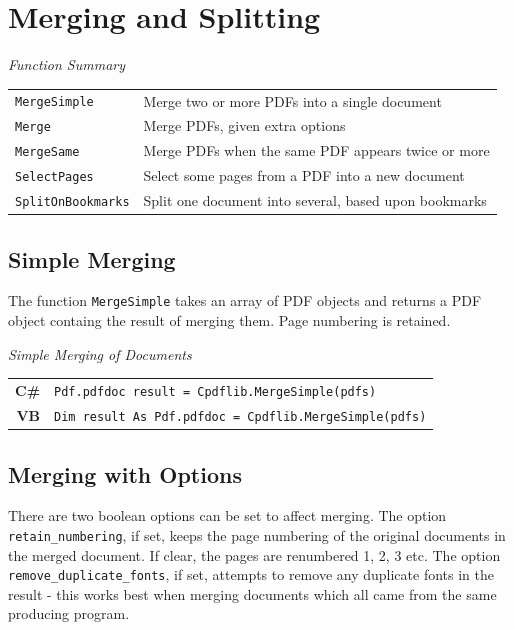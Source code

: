 \documentclass[a4paper]{memoir}
\begin{document}
\chapter{Merging and Splitting}
\begin{framed}
\noindent\textit{Function Summary}\\[2mm]
\noindent\begin{tabular}{ll}
\verb!MergeSimple! & Merge two or more PDFs into a single document\\
\verb!Merge! & Merge PDFs, given extra options\\
\verb!MergeSame! & Merge PDFs when the same PDF appears twice or more\\[5mm]
\verb!SelectPages! & Select some pages from a PDF into a new document\\
\verb!SplitOnBookmarks! & Split one document into several, based upon bookmarks
\end{tabular}
\end{framed}
\section{Simple Merging}
The function \verb!MergeSimple! takes an array of PDF objects and returns a PDF object containg the result of merging them. Page numbering is retained.
\begin{framed}
\noindent\textit{Simple Merging of Documents}\\

\noindent\begin{tabular}{rl}
\small\sffamily\textbf{C\#} &
\begin{minipage}{4in}
\small\verb!Pdf.pdfdoc result = Cpdflib.MergeSimple(pdfs)!
\end{minipage}\\[5mm]
\small\sffamily\textbf{VB} &
\begin{minipage}{4in}
\small\verb!Dim result As Pdf.pdfdoc = Cpdflib.MergeSimple(pdfs)!
\end{minipage}\\[5mm]
\end{tabular}
\end{framed}

\section{Merging with Options}

There are two boolean options can be set to affect merging. The option \verb!retain_numbering!, if set, keeps the page numbering of the original documents in the merged document. If clear, the pages are renumbered 1, 2, 3 etc. The option \verb!remove_duplicate_fonts!, if set, attempts to remove any duplicate fonts in the result - this works best when merging documents which all came from the same producing program.
\end{document}
